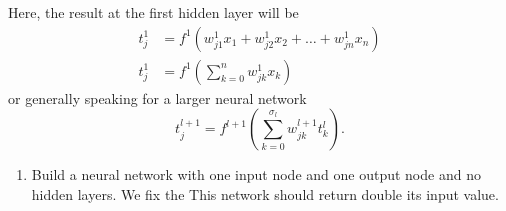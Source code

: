 Here, the result at the first hidden layer will be
\begin{align}
    t^1_j &= f^1\left(w^1_{j1}x_1 + w^1_{j2}x_2 + \dots + w^1_{jn}x_n\right)\\
    t^1_j &= f^1\left(\sum\limits_{k=0}^n w^1_{jk}x_k\right)
\end{align}
or generally speaking for a larger neural network
\begin{equation}
    t^{l+1}_j = f^{l+1}\left(\sum\limits_{k=0}^{\sigma_{l}} w^{l+1}_{jk} t^{l}_k\right).
\end{equation}
\begin{enumerate}
    \item Build a neural network with one input node and one output node and no hidden layers.
    We fix the 
    This network should return double its input value.
\end{enumerate}
